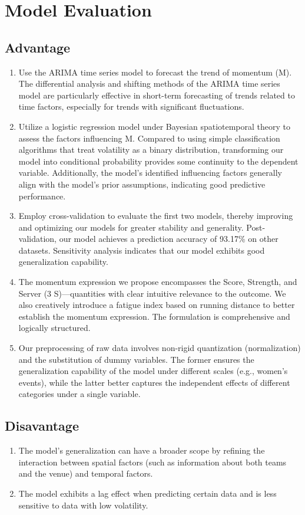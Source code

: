 \documentclass[12pt]{article}
\begin{document}
\section{Model Evaluation}

\subsection{Advantage}
\begin{enumerate}[\bfseries 1.]
	\item Use the ARIMA time series model to forecast the trend of momentum (M). The differential analysis and shifting methods of the ARIMA time series model are particularly effective in short-term forecasting of trends related to time factors, especially for trends with significant fluctuations.
	\item Utilize a logistic regression model under Bayesian spatiotemporal theory to assess the factors influencing M. Compared to using simple classification algorithms that treat volatility as a binary distribution, transforming our model into conditional probability provides some continuity to the dependent variable. Additionally, the model's identified influencing factors generally align with the model's prior assumptions, indicating good predictive performance.
	\item Employ cross-validation to evaluate the first two models, thereby improving and optimizing our models for greater stability and generality. Post-validation, our model achieves a prediction accuracy of 93.17\% on other datasets. Sensitivity analysis indicates that our model exhibits good generalization capability.
	\item The momentum expression we propose encompasses the Score, Strength, and Server (3 S)—quantities with clear intuitive relevance to the outcome. We also creatively introduce a fatigue index based on running distance to better establish the momentum expression. The formulation is comprehensive and logically structured.
	\item Our preprocessing of raw data involves non-rigid quantization (normalization) and the substitution of dummy variables. The former ensures the generalization capability of the model under different scales (e.g., women's events), while the latter better captures the independent effects of different categories under a single variable.
\end{enumerate}

\subsection{Disavantage}
\begin{enumerate}[\bfseries 1.]
	\item The model's generalization can have a broader scope by refining the interaction between spatial factors (such as information about both teams and the venue) and temporal factors.
	\item The model exhibits a lag effect when predicting certain data and is less sensitive to data with low volatility.
\end{enumerate}
\end{document}
